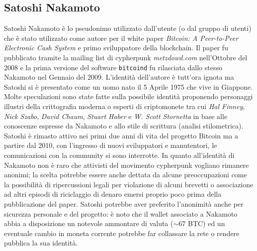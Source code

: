 \appendix
\begin{appendices}
    \chapter{Satoshi Nakamoto}\label{appendix:satoshi}
    Satoshi Nakamoto è lo pseudonimo utilizzato dall'utente (o dal gruppo di utenti) che è stato utilizzato come autore per il white paper \textit{Bitcoin: A Peer-to-Peer Electronic Cash System}\cite{bitcoinwhite} e primo sviluppatore della blockchain.\newline
    Il paper fu pubblicato tramite la mailing list di cypherpunk \textit{metzdowd.com} nell'Ottobre del 2008 e la prima versione del software \texttt{bitcoind} fu rilasciata dallo stesso Nakamoto nel Gennaio del 2009.\newline
    L'identità dell'autore è tutt'ora ignota ma Satoshi si è presentato come un uomo nato il 5 Aprile 1975 che vive in Giappone. Molte speculazioni sono state fatte sulla possibile identità proponendo personaggi illustri della crittografia moderna o esperti di criptomonete tra cui \textit{Hal Finney}, \textit{Nick Szabo}, \textit{David Chaum}, \textit{Stuart Haber} e \textit{W. Scott Stornetta} in base alle conoscenze espresse da Nakamoto e allo stile di scrittura (analisi stilometrica).\newline
    Satoshi è rimasto attivo nei primi due anni di vita del progetto Bitcoin ma a partire dal 2010, con l'ingresso di nuovi sviluppatori e manutentori, le comunicazioni con la community si sono interrotte.\newline
    In quanto all'identità di Nakamoto non è raro che attivisti del movimento cypherpunk vogliano rimanere anonimi; la scelta potrebbe essere anche dettata da alcune preoccupazioni come la possibilità di ripercussioni legali per violazione di alcuni brevetti o associazione ad altri episodi di riciclaggio di denaro emersi proprio poco prima della pubblicazione del paper.\newline
    Satoshi potrebbe aver preferito l'anonimità anche per sicurezza personale e del progetto: è noto che il wallet associato a Nakamoto abbia a disposizione un notevole ammontare di valuta ($\sim67$ BTC) ed un eventuale cambio in moneta corrente potrebbe far collassare la rete o rendere pubblica la sua identità.
\end{appendices}

